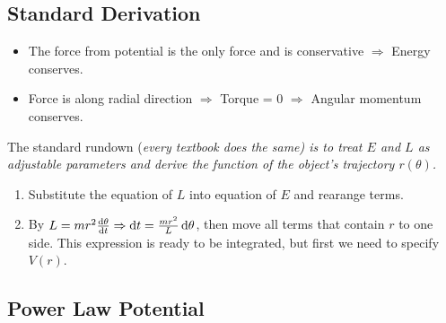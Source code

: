 \documentclass[class=article, crop=false, 12pt]{standalone}
\begin{document}
\subsection{Standard Derivation} 

\begin{itemize}
    \item The force from potential is the only force and is conservative $\Rightarrow$ Energy conserves.
    \item Force is along radial direction $\Rightarrow$ Torque = 0 $\Rightarrow$ Angular momentum conserves.
\end{itemize}

The standard rundown (\it{every textbook does the same}) is to treat $E$ and $L$ as adjustable parameters 
and derive the function of the object's trajectory $r(\theta)$.

\label{standard proof}
\begin{enumerate}
    \item Substitute the equation of $L$ into equation of $E$ and rearange terms.
    \item By $L = mr^2 \dv{\theta}{t} \Rightarrow \dd{t} = \frac{mr^2}{L}\dd{\theta}$, then move all terms that contain $r$ to one side.
    This expression is ready to be integrated, 
    but first we need to specify $V(r)$.
\end{enumerate}


\subsection{Power Law Potential}
\end{document}
